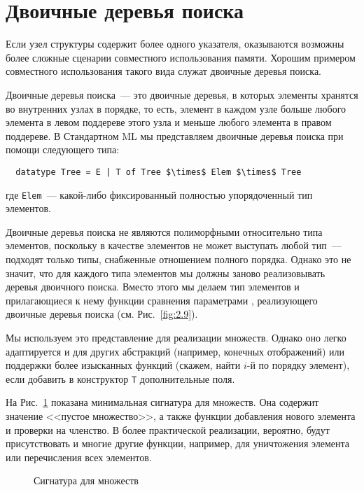 \section{Двоичные деревья поиска}
\label{sc:2.2}

Если узел структуры содержит более одного указателя, оказываются
возможны более сложные сценарии совместного использования памяти. Хорошим примером
совместного использования такого вида служат двоичные деревья поиска.

Двоичные деревья поиска~--- это двоичные деревья, в которых элементы
хранятся во внутренних узлах в 
порядке, то есть, элемент в каждом узле больше любого элемента в
левом поддереве этого узла и меньше любого элемента в правом
поддереве. В Стандартном ML мы представляем двоичные деревья поиска
при помощи следующего типа:
\begin{lstlisting}
  datatype Tree = E | T of Tree $\times$ Elem $\times$ Tree
\end{lstlisting}
где \lstinline!Elem!~--- какой-либо фиксированный полностью упорядоченный
тип элементов.

\begin{remark}
  Двоичные деревья поиска не являются полиморфными относительно типа
  элементов, поскольку в качестве элементов не может выступать любой
  тип~--- подходят только типы, снабженные отношением полного
  порядка. Однако это не значит, что для каждого типа элементов мы
  должны заново реализовывать деревья двоичного поиска. Вместо этого
  мы делаем тип элементов и прилагающиеся к нему функции сравнения
  параметрами , реализующего двоичные деревья
  поиска (см. Рис.~\ref{fig:2.9}).
\end{remark}

Мы используем это представление для реализации множеств. Однако оно
легко адаптируется и для других абстракций (например, конечных
отображений) или поддержки более изысканных функций (скажем, найти
$i$-й по порядку элемент), если добавить в конструктор \lstinline!T!
дополнительные поля.

На Рис.~\ref{fig:2.7} показана минимальная сигнатура для множеств. Она
содержит значение <<пустое множество>>, а также функции добавления
нового элемента и проверки на членство.  В более практической
реализации, вероятно, будут присутствовать и многие другие функции,
например, для уничтожения элемента или перечисления всех элементов.

\begin{figure}
  \centering

  \caption{Сигнатура для множеств}
  \label{fig:2.7}
\end{figure}

